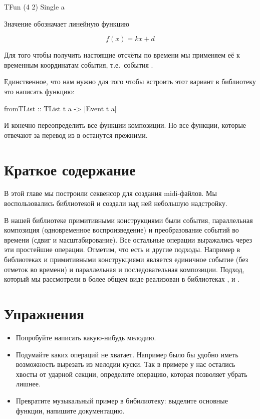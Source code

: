 \begin{code}
TFun (4 2) Single a
\end{code}

Значение  обозначает линейную функцию

\[ f(x) = k x + d \]

Для того чтобы получить настоящие отсчёты по времени мы
применяем её к временным координатам 
события, т.е.~события .

Единственное, что нам нужно для того
чтобы встроить этот вариант в библиотеку это написать
функцию:

\begin{code}
fromTList :: TList t a -> [Event t a]
\end{code}

И конечно переопределить все функции композиции.
Но все функции, которые отвечают за перевод 
из  в  останутся прежними.


\section{Краткое содержание}

В этой главе мы построили секвенсор для создания 
midi-файлов. Мы воспользовались библиотекой  
и создали над ней небольшую надстройку. 

В нашей библиотеке примитивными конструкциями были
события, параллельная композиция (одновременное воспроизведение)
и преобразование событий во времени (сдвиг и масштабирование).
Все остальные операции выражались через эти простейшие операции.
Отметим, что есть и другие подходы. Например в библиотеках
 и  примитивными конструкциями
является единичное событие (без отметок во времени) и
параллельная и последовательная композиции. Подход, который
мы рассмотрели в более общем виде реализован в библиотеках
,  и
.

\section{Упражнения}

\begin{itemize}
\item  Попробуйте написать какую-нибудь мелодию.
\item  Подумайте каких операций не хватает. 
    Например было бы удобно иметь возможность вырезать 
    из мелодии куски. Так в примере у нас остались 
    хвосты от ударной секции, определите операцию,
    которая позволяет убрать лишнее.

\item Превратите музыкальный пример в бибилиотеку:
выделите основные функции, напишите документацию.
\end{itemize}


